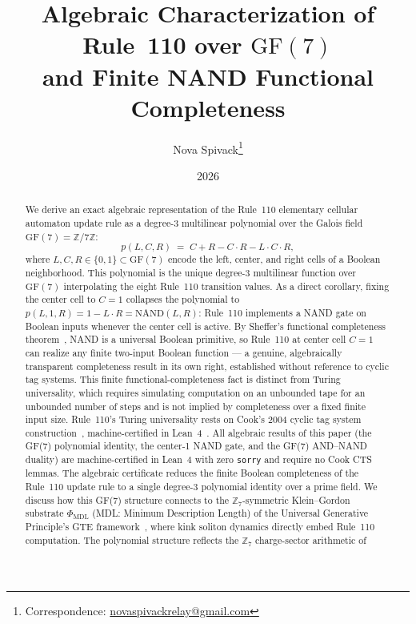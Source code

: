 \documentclass[11pt]{article}
\title{\bfseries Algebraic Characterization of Rule~110 over $\mathrm{GF}(7)$\\[0.3em]
and Finite NAND Functional Completeness}
\author[1]{Nova Spivack\thanks{Correspondence:
  \href{mailto:novaspivackrelay@gmail.com}{novaspivackrelay@gmail.com}}}
\affil[1]{Independent Research}
\date{2026}
\theoremstyle{remark}
\begin{document}
\maketitle
\NovaZenodoAfterTitle

\begin{abstract}
We derive an exact algebraic representation of the Rule~110 elementary cellular
automaton update rule as a degree-3 multilinear polynomial over the Galois field
$\mathrm{GF}(7) = \mathbb{Z}/7\mathbb{Z}$:
\[
  p(L,C,R) \;=\; C + R - C{\cdot}R - L{\cdot}C{\cdot}R,
\]
where $L, C, R \in \{0,1\} \subset \mathrm{GF}(7)$ encode the left, center, and right
cells of a Boolean neighborhood.
This polynomial is the unique degree-3 multilinear function over $\mathrm{GF}(7)$
interpolating the eight Rule~110 transition values.
As a direct corollary, fixing the center cell to $C = 1$ collapses the polynomial to
$p(L,1,R) = 1 - L{\cdot}R = \mathrm{NAND}(L,R)$: Rule~110 implements a NAND gate
on Boolean inputs whenever the center cell is active.
By Sheffer's functional completeness theorem~\cite{Sheffer1913}, NAND is a universal
Boolean primitive, so Rule~110 at center cell $C=1$ can realize any finite
two-input Boolean function --- a genuine, algebraically transparent completeness
result in its own right, established without reference to cyclic tag systems.
This finite functional-completeness fact is distinct from Turing universality,
which requires simulating computation on an unbounded tape for an unbounded
number of steps and is not implied by completeness over a fixed finite input size.
Rule~110's Turing universality rests on Cook's 2004 cyclic tag system
construction~\cite{Cook2004}, machine-certified in Lean~4~\cite{SpivackCookTheorem,rule110-lean}.
All algebraic results of this paper (the GF(7) polynomial identity, the center-1
NAND gate, and the GF(7) AND--NAND duality) are machine-certified in Lean~4 with
zero \texttt{sorry} and require no Cook CTS lemmas.
The algebraic certificate reduces the finite Boolean completeness of the Rule~110
update rule to a single degree-3 polynomial identity over a prime field.
We discuss how this GF(7) structure connects to the $\mathbb{Z}_7$-symmetric
Klein--Gordon substrate $\Phi_{\mathrm{MDL}}$ (MDL: Minimum Description Length) of the Universal Generative Principle's GTE
framework~\cite{SpivackCompUniversality,SpivackGTEMobius}, where kink soliton dynamics
directly embed Rule~110 computation.
The polynomial structure reflects the $\mathbb{Z}_7$ charge-sector arithmetic of

\end{abstract}
\end{document}
